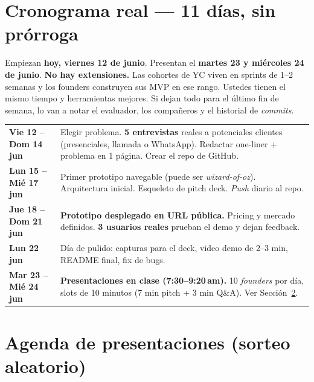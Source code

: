 \documentclass[11pt,a4paper]{article}
\begin{document}
\section{Cronograma real --- 11 d\'ias, sin pr\'orroga}

\begin{tcolorbox}[warnbox={Esto es presi\'on tipo YC --- no de universidad}]
Empiezan \textbf{hoy, viernes 12 de junio}. Presentan el \textbf{martes 23 y
mi\'ercoles 24 de junio}. \textbf{No hay extensiones.} Las cohortes de YC viven
en sprints de 1--2 semanas y los founders construyen sus MVP en ese rango.
Ustedes tienen el mismo tiempo y herramientas mejores. Si dejan todo para el
\'ultimo fin de semana, lo van a notar el evaluador, los compa\~neros y el
historial de \emph{commits}.
\end{tcolorbox}

\renewcommand{\arraystretch}{1.2}
\begin{tabularx}{\linewidth}{@{}>{\bfseries\color{clawOrange}}l X@{}}
\toprule
\textcolor{clawOrange}{Vie 12 -- Dom 14 jun} & Elegir problema. \textbf{5 entrevistas} reales
a potenciales clientes (presenciales, llamada o WhatsApp). Redactar one-liner +
problema en 1 p\'agina. Crear el repo de GitHub. \\
\addlinespace
Lun 15 -- Mi\'e 17 jun & Primer prototipo navegable (puede ser \emph{wizard-of-oz}).
Arquitectura inicial. Esqueleto de pitch deck. \emph{Push} diario al repo. \\
\addlinespace
Jue 18 -- Dom 21 jun & \textbf{Prototipo desplegado en URL p\'ublica.} Pricing y
mercado definidos. \textbf{3 usuarios reales} prueban el demo y dejan feedback. \\
\addlinespace
Lun 22 jun & D\'ia de pulido: capturas para el deck, video demo de 2--3 min,
README final, fix de bugs. \\
\addlinespace
\textbf{Mar 23 -- Mi\'e 24 jun} & \textbf{Presentaciones en clase (7:30--9:20\,am).}
10 \emph{founders} por d\'ia, slots de 10 minutos (7 min pitch + 3 min Q\&A).
Ver Secci\'on~\ref{sec:agenda}. \\
\bottomrule
\end{tabularx}

\section{Agenda de presentaciones (sorteo aleatorio)}\label{sec:agenda}
\end{document}
